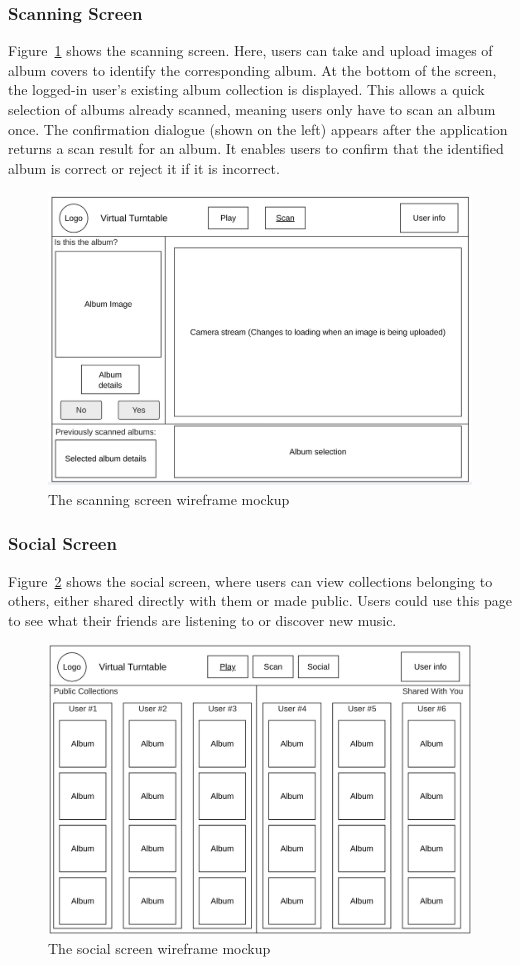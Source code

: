 \subsubsection{Scanning Screen}
Figure~\ref{fig:scan_screen_mockup} shows the scanning screen. Here, users can take and upload images of album covers to identify the corresponding album.
At the bottom of the screen, the logged-in user’s existing album collection is displayed. This allows a quick selection of albums already scanned, meaning users only have to scan an album once.
The confirmation dialogue (shown on the left) appears after the application returns a scan result for an album. It enables users to confirm that the identified album is correct or reject it if it is incorrect.

\begin{figure} [H]
    \centering
    \includegraphics[width=0.6\linewidth]{figures/scan_screen_mockup.png}
    \caption{The scanning screen wireframe mockup}
    \label{fig:scan_screen_mockup}
\end{figure}


\subsubsection{Social Screen}
Figure~\ref{fig:social_screen_mockup} shows the social screen, where users can view collections belonging to others, either shared directly with them or made public. Users could use this page to see what their friends are listening to or discover new music.

\begin{figure} [H]
    \centering
    \includegraphics[width=0.6\linewidth]{figures/social_screen_mockup.png}
    \caption{The social screen wireframe mockup}
    \label{fig:social_screen_mockup}
\end{figure}

